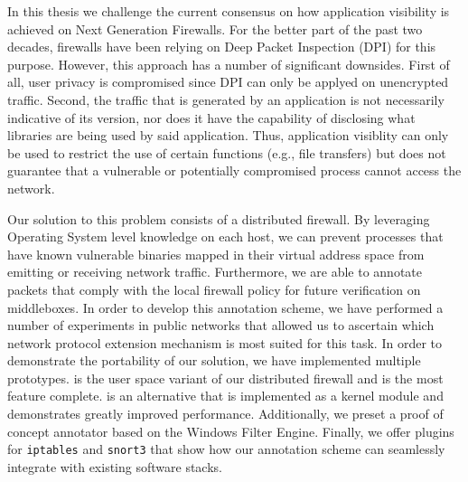 
In this thesis we challenge the current consensus on how application visibility
is achieved on Next Generation Firewalls. For the better part of the past two
decades, firewalls have been relying on Deep Packet Inspection (DPI) for this purpose.
However, this approach has a number of significant downsides. First of all,
user privacy is compromised since DPI can only be applyed on unencrypted traffic.
Second, the traffic that is generated by an application is not necessarily
indicative of its version, nor does it have the capability of disclosing what
libraries are being used by said application. Thus, application visiblity can only
be used to restrict the use of certain functions (e.g., file transfers) but does
not guarantee that a vulnerable or potentially compromised process cannot access
the network.

Our solution to this problem consists of a distributed firewall. By leveraging
Operating System level knowledge on each host, we can prevent processes
that have known vulnerable binaries mapped in their virtual address space from
emitting or receiving network traffic. Furthermore, we are able to annotate
packets that comply with the local firewall policy for future verification on
middleboxes. In order to develop this annotation scheme, we have performed
a number of experiments in public networks that allowed us to ascertain which
network protocol extension mechanism is most suited for this task. In order to
demonstrate the portability of our solution, we have implemented multiple
prototypes. \daf{} is the user space variant of our distributed firewall and is
the most feature complete. \scout{} is an alternative that is implemented as
a kernel module and demonstrates greatly improved performance. Additionally, we
preset a proof of concept annotator based on the Windows Filter Engine. Finally,
we offer plugins for \texttt{iptables} and \texttt{snort3} that show how our
annotation scheme can seamlessly integrate with existing software stacks.


